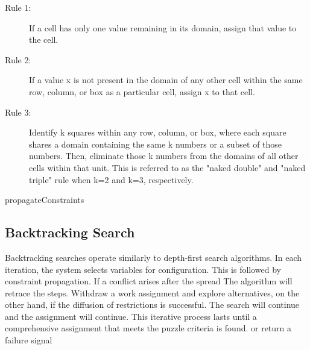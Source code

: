 \documentclass{article}
\begin{document}
\begin{description}
  \item[Rule 1:] If a cell has only one value remaining in its domain, assign that value to the cell.
  \item[Rule 2:] If a value x is not present in the domain of any other cell within the same row, column, or box as a particular cell, assign x to that cell.
  \item[Rule 3:] Identify k squares within any row, column, or box, where each square shares a domain containing the same k numbers or a subset of those numbers. Then, eliminate those k numbers from the domains of all other cells within that unit. This is referred to as the "naked double" and "naked triple" rule when k=2 and k=3, respectively.
\end{description}

\begin{algorithm}[h]
  
  \caption{propagateConstraints}
  \begin{algorithmic}
    \EndIf
    \EndIf
\EndIf
    \EndIf
\EndIf
{}
 

   
\EndIf
        \EndIf
        \EndIf  
            \EndWhile
\end{algorithmic}
\label{alg:Constraint Propagation}
\end{algorithm}
 
   
   
 
 

\subsection{Backtracking Search}
Backtracking searches operate similarly to depth-first search algorithms. In each iteration, the system selects variables for configuration. This is followed by constraint propagation. If a conflict arises after the spread The algorithm will retrace the steps. Withdraw a work assignment and explore alternatives, on the other hand, if the diffusion of restrictions is successful. The search will continue and the assignment will continue. This iterative process lasts until a comprehensive assignment that meets the puzzle criteria is found. or return a failure signal
\end{document}
